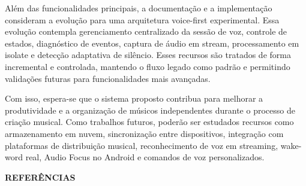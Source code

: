 \documentclass[12pt,oneside,a4paper,brazil,final]{abntex2}
\begin{document}
Além das funcionalidades principais, a documentação e a implementação consideram a evolução para uma arquitetura voice-first experimental. Essa evolução contempla gerenciamento centralizado da sessão de voz, controle de estados, diagnóstico de eventos, captura de áudio em stream, processamento em isolate e detecção adaptativa de silêncio. Esses recursos são tratados de forma incremental e controlada, mantendo o fluxo legado como padrão e permitindo validações futuras para funcionalidades mais avançadas.



Com isso, espera-se que o sistema proposto contribua para melhorar a produtividade e a organização de músicos independentes durante o processo de criação musical. Como trabalhos futuros, poderão ser estudados recursos como armazenamento em nuvem, sincronização entre dispositivos, integração com plataformas de distribuição musical, reconhecimento de voz em streaming, wake-word real, Audio Focus no Android e comandos de voz personalizados.






\postextual



\cleardoublepage





\begin{center}

\textbf{REFERÊNCIAS}

\end{center}



\vspace{\onelineskip}



\SingleSpacing

\setlength{\parindent}{0cm}
\end{document}
